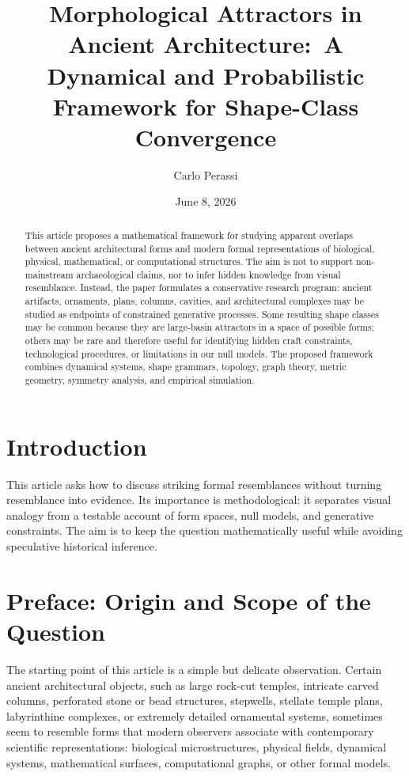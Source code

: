 \documentclass[11pt,a4paper]{article}
\title{Morphological Attractors in Ancient Architecture:\
A Dynamical and Probabilistic Framework for Shape-Class Convergence}
\author{Carlo Perassi}
\date{June 8, 2026}
\begin{document}
\maketitle

\begin{abstract}
This article proposes a mathematical framework for studying apparent overlaps between ancient architectural forms and modern formal representations of biological, physical, mathematical, or computational structures. The aim is not to support non-mainstream archaeological claims, nor to infer hidden knowledge from visual resemblance. Instead, the paper formulates a conservative research program: ancient artifacts, ornaments, plans, columns, cavities, and architectural complexes may be studied as endpoints of constrained generative processes. Some resulting shape classes may be common because they are large-basin attractors in a space of possible forms; others may be rare and therefore useful for identifying hidden craft constraints, technological procedures, or limitations in our null models. The proposed framework combines dynamical systems, shape grammars, topology, graph theory, metric geometry, symmetry analysis, and empirical simulation.
\end{abstract}

\section{Introduction}

This article asks how to discuss striking formal resemblances without turning
resemblance into evidence. Its importance is methodological: it separates visual
analogy from a testable account of form spaces, null models, and generative
constraints. The aim is to keep the question mathematically useful while
avoiding speculative historical inference.

\section*{Preface: Origin and Scope of the Question}

The starting point of this article is a simple but delicate observation. Certain ancient architectural objects, such as large rock-cut temples, intricate carved columns, perforated stone or bead structures, stepwells, stellate temple plans, labyrinthine complexes, or extremely detailed ornamental systems, sometimes seem to resemble forms that modern observers associate with contemporary scientific representations: biological microstructures, physical fields, dynamical systems, mathematical surfaces, computational graphs, or other formal models.
\end{document}
